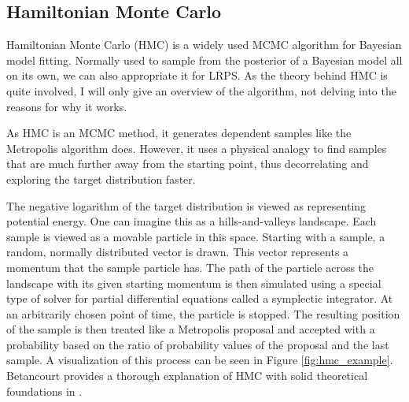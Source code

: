 \documentclass[12pt, a4paper]{report}
\begin{document}
\subsection{Hamiltonian Monte Carlo}
Hamiltonian Monte Carlo (HMC) is a widely used MCMC algorithm for Bayesian model fitting.
Normally used to sample from the posterior of a Bayesian model all on its own, we can also appropriate it for LRPS.
As the theory behind HMC is quite involved, I will only give an overview of the algorithm, not delving into the reasons for why it works.

As HMC is an MCMC method, it generates dependent samples like the Metropolis algorithm does.
However, it uses a physical analogy to find samples that are much further away from the starting point, thus decorrelating and exploring the target distribution faster.

The negative logarithm of the target distribution is viewed as representing potential energy.
One can imagine this as a hills-and-valleys landscape.
Each sample is viewed as a movable particle in this space.
Starting with a sample, a random, normally distributed vector is drawn.
This vector represents a momentum that the sample particle has.
The path of the particle across the landscape with its given starting momentum is then simulated using a special type of solver for partial differential equations called a symplectic integrator.
At an arbitrarily chosen point of time, the particle is stopped.
The resulting position of the sample is then treated like a Metropolis proposal and accepted with a probability based on the ratio of probability values of the proposal and the last sample.
A visualization of this process can be seen in Figure \ref{fig:hmc_example}.
Betancourt provides a thorough explanation of HMC with solid theoretical foundations in \cite{hmc}.
\end{document}
